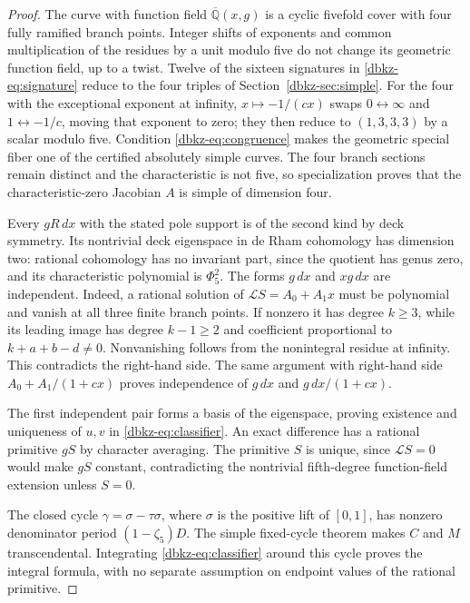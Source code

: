 \documentclass[11pt,a4paper]{article}
\theoremstyle{definition}
\theoremstyle{remark}
\numberwithin{equation}{section}
\begin{document}
\begin{proof}
The curve with function field $\overline{\mathbb Q}(x,g)$ is a cyclic
fivefold cover with four fully ramified branch points. Integer shifts
of exponents and common multiplication of the residues by a unit
modulo five do not change its geometric function field, up to a twist.
Twelve of the sixteen signatures in \eqref{dbkz-eq:signature} reduce
to the four triples of Section~\ref{dbkz-sec:simple}. For the four with
the exceptional exponent at infinity, $x\mapsto-1/(cx)$ swaps
$0\leftrightarrow\infty$ and $1\leftrightarrow-1/c$, moving that
exponent to zero; they then reduce to $(1,3,3,3)$ by a scalar modulo
five. Condition \eqref{dbkz-eq:congruence} makes the geometric special
fiber one of the certified absolutely simple curves. The four branch
sections remain distinct and the characteristic is not five, so
specialization proves that the characteristic-zero Jacobian $A$ is
simple of dimension four.

Every $gR\,dx$ with the stated pole support is of the second kind by
deck symmetry. Its nontrivial deck eigenspace in de Rham cohomology has
dimension two: rational cohomology has no invariant part, since the
quotient has genus zero, and its characteristic polynomial is
$\Phi_5^2$. The forms $g\,dx$ and $xg\,dx$ are independent. Indeed,
a rational solution of $\mathcal LS=A_0+A_1x$ must be polynomial and
vanish at all three finite branch points. If nonzero it has degree
$k\ge3$, while its leading image has degree $k-1\ge2$ and coefficient
proportional to $k+a+b-d\ne0$. Nonvanishing follows from the
nonintegral residue at infinity. This contradicts the right-hand side.
The same argument with right-hand side $A_0+A_1/(1+cx)$ proves
independence of $g\,dx$ and $g\,dx/(1+cx)$.

The first independent pair forms a basis of the eigenspace, proving
existence and uniqueness of $u,v$ in \eqref{dbkz-eq:classifier}.
An exact difference has a rational primitive $gS$ by character
averaging. The primitive $S$ is unique, since
$\mathcal LS=0$ would make $gS$ constant, contradicting the
nontrivial fifth-degree function-field extension unless $S=0$.

The closed cycle $\gamma=\sigma-\tau\sigma$, where $\sigma$ is the
positive lift of $[0,1]$, has nonzero denominator period
$(1-\zeta_5)D$. The simple fixed-cycle theorem makes $C$ and $M$
transcendental. Integrating \eqref{dbkz-eq:classifier} around this
cycle proves the integral formula, with no separate assumption on
endpoint values of the rational primitive.


\end{proof}
\end{document}

